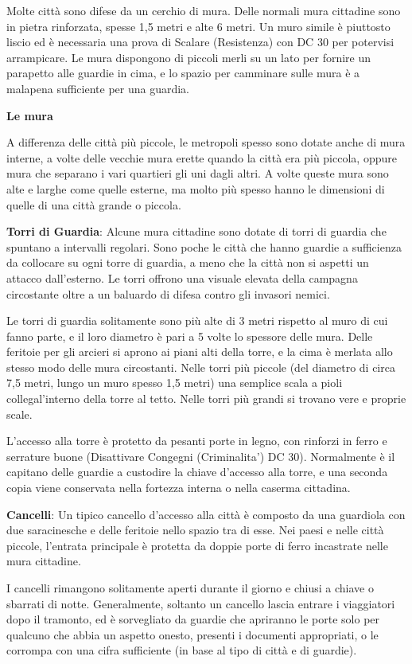 \documentclass[a4paper,11pt,twoside,openany]{book}
\begin{document}
{Molte città sono difese da un cerchio di mura. Delle normali mura cittadine sono in pietra rinforzata, spesse 1,5 metri e alte 6 metri. Un muro simile è piuttosto liscio ed è necessaria una prova di Scalare (Resistenza) con DC 30 per potervisi arrampicare. Le mura dispongono di piccoli merli su un lato per fornire un parapetto alle guardie in cima, e lo spazio per camminare sulle mura è a malapena sufficiente per una guardia.

\textbf{Le mura}

A differenza delle città più piccole, le metropoli spesso sono dotate anche di mura interne, a volte delle vecchie mura erette quando la città era più piccola, oppure mura che separano i vari quartieri gli uni dagli altri. A volte queste mura sono alte e larghe come quelle esterne, ma molto più spesso hanno le dimensioni di quelle di una città grande o piccola.

\textbf{Torri di Guardia}: Alcune mura cittadine sono dotate di torri di guardia che spuntano a intervalli regolari. Sono poche le città che hanno guardie a sufficienza da collocare su ogni torre di guardia, a meno che la città non si aspetti un attacco dall'esterno. Le torri offrono una visuale elevata della campagna circostante oltre a un baluardo di difesa contro gli invasori nemici.

Le torri di guardia solitamente sono più alte di 3 metri rispetto al muro di cui fanno parte, e il loro diametro è pari a 5 volte lo spessore delle mura. Delle feritoie per gli arcieri si aprono ai piani alti della torre, e la cima è merlata allo stesso modo delle mura circostanti. Nelle torri più piccole (del diametro di circa 7,5 metri, lungo un muro spesso 1,5 metri) una semplice scala a pioli collegal'interno della torre al tetto. Nelle torri più grandi si trovano vere e proprie scale.

L'accesso alla torre è protetto da pesanti porte in legno, con rinforzi in ferro e serrature buone (Disattivare Congegni (Criminalita') DC 30). Normalmente è il capitano delle guardie a custodire la chiave d'accesso alla torre, e una seconda copia viene conservata nella fortezza interna o nella caserma cittadina.

\textbf{Cancelli}: Un tipico cancello d'accesso alla città è composto da una guardiola con due saracinesche e delle feritoie nello spazio tra di esse. Nei paesi e nelle città piccole, l'entrata principale è protetta da doppie porte di ferro incastrate nelle mura cittadine.

I cancelli rimangono solitamente aperti durante il giorno e chiusi a chiave o sbarrati di notte. Generalmente, soltanto un cancello lascia entrare i viaggiatori dopo il tramonto, ed è sorvegliato da guardie che apriranno le porte solo per qualcuno che abbia un aspetto onesto, presenti i documenti appropriati, o le corrompa con una cifra sufficiente (in base al tipo di città e di guardie).

}
\end{document}
